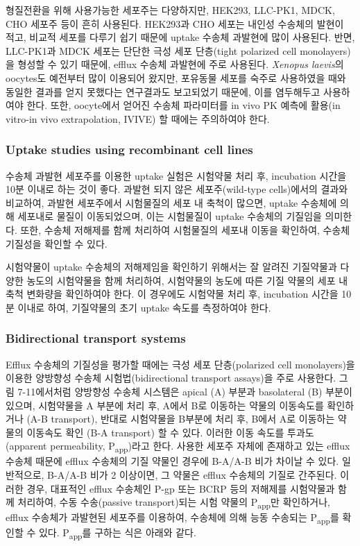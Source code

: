 \documentclass[
  11pt,
  krantz2, a4paper, twoside]{krantz}
\begin{document}
형질전환을 위해 사용가능한 세포주는 다양하지만, HEK293, LLC-PK1, MDCK,
CHO 세포주 등이 흔히 사용된다. HEK293과 CHO 세포는 내인성 수송체의
발현이 적고, 비교적 세포를 다루기 쉽기 때문에 uptake 수송체 과발현에
많이 사용된다. 반면, LLC-PK1과 MDCK 세포는 단단한 극성 세포 단층(tight
polarized cell monolayers)을 형성할 수 있기 때문에, efflux 수송체
과발현에 주로 사용된다. \emph{Xenopus laevis}의 oocytes도 예전부터 많이
이용되어 왔지만, 포유동물 세포를 숙주로 사용하였을 때와 동일한 결과를
얻지 못했다는 연구결과도 보고되었기 때문에, 이를 염두해두고 사용하여야
한다. 또한, oocyte에서 얻어진 수송체 파라미터를 in vivo PK 예측에
활용(in vitro-in vivo extrapolation, IVIVE) 할 때에는 주의하여야 한다.

\hypertarget{uptake-studies-using-recombinant-cell-lines}{%
\subsubsection{Uptake studies using recombinant cell lines}\label{uptake-studies-using-recombinant-cell-lines}}

수송체 과발현 세포주를 이용한 uptake 실험은 시험약물 처리 후, incubation
시간을 10분 이내로 하는 것이 좋다. 과발현 되지 않은 세포주(wild-type
cells)에서의 결과와 비교하여, 과발현 세포주에서 시험물질의 세포 내
축척이 많으면, uptake 수송체에 의해 세포내로 물질이 이동되었으며, 이는
시험물질이 uptake 수송체의 기질임을 의미한다. 또한, 수송체 저해제를 함께
처리하여 시험물질의 세포내 이동을 확인하여, 수송체 기질성을 확인할 수
있다.

시험약물이 uptake 수송체의 저해제임을 확인하기 위해서는 잘 알려진
기질약물과 다양한 농도의 시험약물을 함께 처리하여, 시험약물의 농도에
따른 기질 약물의 세포 내 축척 변화량을 확인하여야 한다. 이 경우에도
시험약물 처리 후, incubation 시간을 10분 이내로 하여, 기질약물의 초기
uptake 속도를 측정하여야 한다.

\hypertarget{bidirectional-transport-systems}{%
\subsubsection{Bidirectional transport systems}\label{bidirectional-transport-systems}}

Efflux 수송체의 기질성을 평가할 때에는 극성 세포 단층(polarized cell
monolayers)을 이용한 양방향성 수송체 시험법(bidirectional transport
assays)을 주로 사용한다. 그림 7-11에서처럼 양방향성 수송체 시스템은
apical (A) 부분과 basolateral (B) 부분이 있으며, 시험약물을 A 부분에
처리 후, A에서 B로 이동하는 약물의 이동속도를 확인하거나 (A-B
transport), 반대로 시험약물을 B부분에 처리 후, B에서 A로 이동하는 약물의
이동속도 확인 (B-A transport) 할 수 있다. 이러한 이동 속도를
투과도(apparent permeability, P\textsubscript{app})라고 한다. 사용한 세포주 자체에
존재하고 있는 efflux 수송체 때문에 efflux 수송체의 기질 약물인 경우에
B-A/A-B 비가 차이날 수 있다. 일반적으로, B-A/A-B 비가 2 이상이면, 그
약물은 efflux 수송체의 기질로 간주된다. 이러한 경우, 대표적인 efflux
수송체인 P-gp 또는 BCRP 등의 저해제를 시험약물과 함께 처리하여, 수동
수송(passive transport)되는 시험 약물의 P\textsubscript{app}만 확인하거나, efflux
수송체가 과발현된 세포주를 이용하여, 수송체에 의해 능동 수송되는
P\textsubscript{app}를 확인할 수 있다. P\textsubscript{app}를 구하는 식은 아래와 같다.
\end{document}
